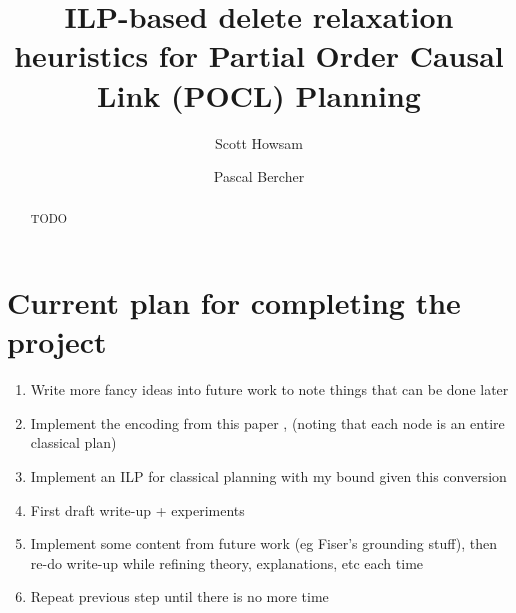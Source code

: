 \documentclass[runningheads]{llncs}
\begin{document}
\title{ILP-based delete relaxation heuristics for Partial Order Causal Link (POCL) Planning}

\author{Scott Howsam \and Pascal Bercher}


\maketitle 

\begin{abstract}
TODO  
\end{abstract}

\section{Current plan for completing the project}
\begin{enumerate}
    \item Write more fancy ideas into future work to note things that can be done later
    \item Implement the encoding from this paper \cite{Bercher2013POCLHeuristicsViaEncoding}, (noting that each node is an entire classical plan)
    \item Implement an ILP for classical planning with my bound given this conversion
    \item First draft write-up + experiments
    \item Implement some content from future work (eg Fiser's grounding stuff), then re-do write-up while refining theory, explanations, etc each time
    \item Repeat previous step until there is no more time
\end{enumerate}
\end{document}
